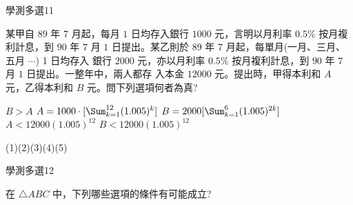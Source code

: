 \begin{QUESTIONS}
\begin{QUESTION}
\begin{QEMPTYSPACE}
        \end{QEMPTYSPACE}
    \end{QUESTION}
    \begin{QUESTION}
        \begin{ExamInfo}{91}{學測}{多選}{11}
        \end{ExamInfo}
        \begin{ExamAnsRateInfo}{16}{30}{12}{6}
        \end{ExamAnsRateInfo}
        \begin{QBODY}
            某甲自 $89$ 年 $7$ 月起，每月 $1$ 日均存入銀行 $1000$ 元，言明以月利率 $0.5\%$ 按月複利計息，到 $90$ 年 $7$ 月 $1$ 日提出。某乙則於 $89$ 年 $7$ 月起，每單月(一月、三月、五月 $\cdots$) 1 日均存入 銀行 $2000$ 元，亦以月利率 $0.5\%$ 按月複利計息，到 $90$ 年 $7$ 月 $1$ 日提出。一整年中，兩人都存 入本金 $12000$ 元。提出時，甲得本利和 $A$ 元，乙得本利和 $B$ 元。問下列選項何者為真? 
            \begin{QOPS} 
                \QOP $B>A$ 
                \QOP $A= 1000\cdot [\Sum_{k=1}^{12} (1.005)^k ]$ 
                \QOP $B= 2000 [\Sum_{k=1}^{6} (1.005)^{2k}] $ 
                \QOP $A< 12000 (1.005)^{12}$  
                \QOP $B< 12000 (1.005)^{12}$
            \end{QOPS}
        \end{QBODY}
        \begin{QFROMS}
        \end{QFROMS}
        \begin{QTAGS}\end{QTAGS}
        \begin{QANS}
            (1)(2)(3)(4)(5)
        \end{QANS}
        \begin{QSOLLIST}
        \end{QSOLLIST}
        \begin{QEMPTYSPACE}
        \end{QEMPTYSPACE}
    \end{QUESTION}
    \begin{QUESTION}
        \begin{ExamInfo}{91}{學測}{多選}{12}
        \end{ExamInfo}
        \begin{ExamAnsRateInfo}{36}{67}{29}{12}
        \end{ExamAnsRateInfo}
        \begin{QBODY}
            在 $\triangle ABC$ 中，下列哪些選項的條件有可能成立?

\end{QBODY}
\end{QUESTION}
\end{QUESTIONS}
